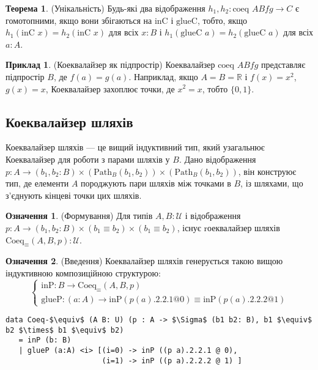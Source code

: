 \documentclass{article}
\theoremstyle{definition}
\newtheorem{theorem}{Теорема}
\newtheorem{definition}{Означення}
\newtheorem{example}{Приклад}
\begin{document}
\begin{theorem} (Унікальність)
Будь-які два відображення \( h_1, h_2 : \text{coeq } A B f g \to C \) є гомотопними,
якщо вони збігаються на \( \text{inC} \) і \( \text{glueC} \), тобто,
якщо \( h_1(\text{inC } x) = h_2(\text{inC } x) \) для
всіх \( x : B \) і \( h_1(\text{glueC } a) = h_2(\text{glueC } a) \) для всіх \( a : A \).
\end{theorem}

\begin{example} (Коеквалайзер як підпростір)
Коеквалайзер \( \text{coeq } A B f g \) представляє підпростір
\( B \), де \( f(a) = g(a) \). Наприклад, якщо \( A = B = \mathbb{R} \)
і \( f(x) = x^2 \), \( g(x) = x \), Коеквалайзер захоплює точки,
де \( x^2 = x \), тобто \( \{0, 1\} \).
\end{example}

\newpage
\subsection{Коеквалайзер шляхів}
Коеквалайзер шляхів — це вищий індуктивний тип, який узагальнює
Коеквалайзер для роботи з парами шляхів у \( B \). Дано
відображення \( p : A \to (b_1, b_2 : B) \times (\text{Path}_B (b_1, b_2)) \times (\text{Path}_B (b_1, b_2)) \),
він конструює тип, де елементи \( A \) породжують пари
шляхів між точками в \( B \), із шляхами, що з’єднують
кінцеві точки цих шляхів.

\begin{definition} (Формування)
Для типів \( A, B : \mathcal{U} \) і відображення \( p : A \to (b_1, b_2 : B) \times (b_1 \equiv b_2) \times (b_1 \equiv b_2) \),
існує rоеквалайзер шляхів \( \text{Coeq}_\equiv(A,B,p) : \mathcal{U} \).
\end{definition}

\begin{definition} (Введення)
Коеквалайзер шляхів генерується такою вищою індуктивною композиційною структурою:
\[
\begin{cases}
\text{inP} : B \to \text{Coeq}_\equiv(A,B,p) \\
\text{glueP} : (a : A) \to \text{inP}(p(a).2.2.1 @ 0) \equiv \text{inP}(p(a).2.2.2 @ 1)
\end{cases}
\]
\begin{lstlisting}[mathescape=true]
data Coeq-$\equiv$ (A B: U) (p : A -> $\Sigma$ (b1 b2: B), b1 $\equiv$ b2 $\times$ b1 $\equiv$ b2)
   = inP (b: B)
   | glueP (a:A) <i> [(i=0) -> inP ((p a).2.2.1 @ 0),
                      (i=1) -> inP ((p a).2.2.2 @ 1) ]
\end{lstlisting}
\end{definition}
\end{document}
